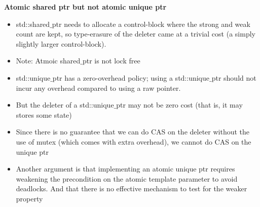 \documentclass[10pt, landscape]{article}
\begin{document}
\begin{multicols}{4}
\textbf{Atomic shared ptr but not atomic unique ptr} \\
\begin{itemize}
    \item std::shared$\_$ptr needs to allocate a control-block where the strong and weak count are kept, so type-erasure of the deleter came at a trivial cost (a simply slightly larger control-block).
    \item Note: Atmoic shared$\_$ptr is not lock free
    \item std::unique$\_$ptr has a zero-overhead policy; using a std::unique$\_$ptr should not incur any overhead compared to using a raw pointer.
    \item But the deleter of a std::unique$\_$ptr may not be zero cost (that is, it may stores some state)
    \item Since there is no guarantee that we can do CAS on the deleter without the use of mutex (which comes with extra overhead), we cannot do CAS on the unique ptr
    \item Another argument is that implementing an atomic unique ptr requires weakening the precondition on the atomic template parameter to avoid deadlocks. And that there is no effective mechanism to test for the weaker property
\end{itemize}

\end{multicols}
\end{document}
